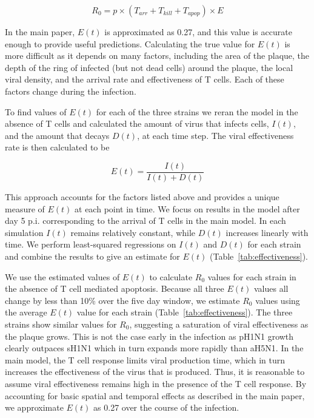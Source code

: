 \documentclass[10pt]{article}
\begin{document}
\begin{equation}
R_0 = p \times (T_{arr} + T_{kill} + T_{apop}) \times E
\end{equation}

In the main paper, $E(t)$ is approximated as 0.27, and this value is accurate enough to provide useful predictions.  Calculating the true value for $E(t)$ is more difficult as it depends on many factors, including the area of the plaque, the depth of the ring of infected (but not dead cells) around the plaque, the local viral density, and the arrival rate and effectiveness of T cells.  Each of these factors change during the infection. 

To find values of $E(t)$ for each of the three strains we reran the model in the absence of T cells and calculated the amount of virus that infects cells, $I(t)$, and the amount that decays $D(t)$, at each time step.  The viral effectiveness rate is then calculated to be

\begin{equation}
E(t) = \frac{I(t)}{I(t) + D(t)}
\end{equation}

This approach accounts for the factors listed above and provides a unique measure of $E(t)$ at each point in time.  We focus on results in the model after day 5 p.i. corresponding to the arrival of T cells in the main model.  In each simulation $I(t)$ remains relatively constant, while $D(t)$ increases linearly with time.  We perform least-squared regressions on $I(t)$ and $D(t)$ for each strain and combine the results to give an estimate for $E(t)$ (Table~\ref{tab:effectiveness}).  

We use the estimated values of $E(t)$ to calculate $R_0$ values for each strain in the absence of T cell mediated apoptosis.  Because all three $E(t)$ values all change by less than 10\% over the five day window, we estimate $R_0$ values using the average $E(t)$ value for each strain (Table~\ref{tab:effectiveness}).  The three strains show similar values for $R_0$, suggesting a saturation of viral effectiveness as the plaque grows.   This is not the case early in the infection as pH1N1 growth clearly outpaces sH1N1 which in turn expands more rapidly than aH5N1.  In the main model, the T cell response limits viral production time, which in turn increases the effectiveness of the virus that is produced.  Thus, it is reasonable to assume viral effectiveness remains high in the presence of the T cell response.  By accounting for basic spatial and temporal effects as described in the main paper, we approximate $E(t)$ as 0.27 over the course of the infection.
\end{document}
